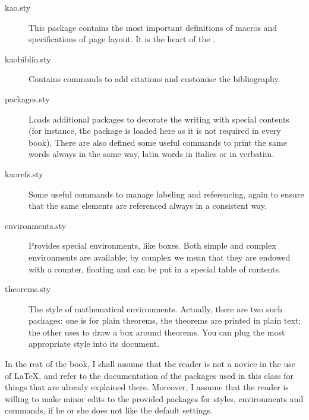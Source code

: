 \begin{description}
	\item[kao.sty] This package contains the most important definitions 
	of macros and specifications of page layout. It is the heart of the 
	.
	\item[kaobiblio.sty] Contains commands to add citations and 
	customise the bibliography.
	\item[packages.sty] Loads additional packages to decorate the 
	writing with special contents (for instance, the  
	package is loaded here as it is not required in every book). There 
	are also defined some useful commands to print the same words always 
	in the same way, \eg {}latin words in italics or  in 
	verbatim.
	\item[kaorefs.sty] Some useful commands to manage labeling and 
	referencing, again to ensure that the same elements are referenced 
	always in a consistent way.
	\item[environments.sty] Provides special environments, like boxes. 
	Both simple and complex environments are available; by complex we 
	mean that they are endowed with a counter, floating and can be put 
	in a special table of contents.
	\item[theorems.sty] The style of mathematical environments. 
	Actually, there are two such packages: one is for plain theorems,
	\ie the theorems are printed in plain text; the other uses 
	 to draw a box around theorems. You can plug the 
	most appropriate style into its document.
\end{description}


In the rest of the book, I shall assume that the reader is not a novice 
in the use of \LaTeX, and refer to the documentation of the packages 
used in this class for things that are already explained there. 
Moreover, I assume that the reader is willing to make minor edits to the 
provided packages for styles, environments and commands, if he or she 
does not like the default settings.

